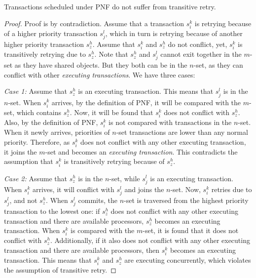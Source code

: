 \begin{clm}\label{PNF-transitive-retry}
Transactions scheduled under PNF do not suffer from transitive
retry.
\end{clm}
\begin{proof}\normalfont
Proof is by contradiction. Assume that a transaction $s_{i}^{k}$
is retrying because of a higher priority transaction $s_{j}^{l}$, which
in turn is retrying because of another higher priority transaction
$s_{z}^{h}$. Assume that $s_{i}^{k}$ and $s_{z}^{h}$ do not conflict, yet,
$s_{i}^{k}$ is transitively retrying due to $s_{z}^{h}$. 
Note that $s_{z}^{h}$ and $s_{j}^{l}$ cannot exit together in
the $m$-set as they have shared objects. But they both can
be in the $n$-set, as they can conflict with other \emph{executing
transactions}. We have three cases:

\textit{Case 1:} Assume that $s_{z}^{h}$ is an executing transaction. This means that $s_{j}^{l}$ is in the $n$-set. When $s_{i}^{k}$ arrives, by the definition of PNF, it will be compared with the $m$-set, which contains $s_{z}^{h}$. Now, it will be found that $s_{i}^{k}$ does not conflict with $s_{z}^{h}$. Also, by the definition of PNF, $s_{i}^{k}$ is not compared with transactions in the $n$-set. When it newly arrives, priorities of $n$-set transactions are lower than any normal priority. Therefore, as $s_{i}^{k}$ does not conflict with any other executing
transaction, it joins the $m$-set and becomes an \emph{executing
transaction}. This contradicts the assumption that $s_{i}^{k}$
is transitively retrying because of $s_{z}^{h}$.



\textit{Case 2:} Assume that $s_{z}^{h}$ is in the $n$-set, while $s_{j}^{l}$
is an executing transaction. When $s_{i}^{k}$ arrives, it will conflict
with $s_{j}^{l}$ and joins the $n$-set. Now, $s_{i}^{k}$
retries due to $s_{j}^{l}$, and not $s_{z}^{h}$. When $s_{j}^{l}$ commits,
the $n$-set is traversed from the highest priority transaction
to the lowest one: if $s_{z}^{h}$ does not conflict with any other
executing transaction and there are available processors, $s_{z}^{h}$
becomes an executing transaction. When $s_{i}^{k}$ is compared with 
the $m$-set, it is found that it does not conflict with $s_{z}^{h}$. Additionally, if it also does not conflict with any other executing transaction and there are available processors, then $s_{i}^{k}$ becomes an executing
transaction. This means that $s_{i}^{k}$ and $s_{z}^{h}$ are executing
concurrently, which violates the assumption of transitive retry.


\end{proof}
